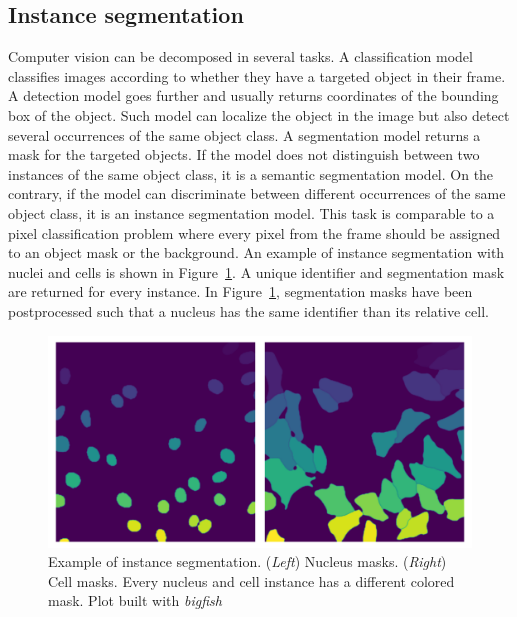 \subsection{Instance segmentation}
\label{subsec:segmentation_instance_introduction}

Computer vision can be decomposed in several tasks.
A classification model classifies images according to whether they have a targeted object in their frame.
A detection model goes further and usually returns coordinates of the bounding box of the object.
Such model can localize the object in the image but also detect several occurrences of the same object class.
A segmentation model returns a mask for the targeted objects.
If the model does not distinguish between two instances of the same object class, it is a semantic segmentation model.
On the contrary, if the model can discriminate between different occurrences of the same object class, it is an instance segmentation model.
This task is comparable to a pixel classification problem where every pixel from the frame should be assigned to an object mask or the background.
An example of instance segmentation with nuclei and cells is shown in Figure~\ref{fig:instance_segmentation_example}.
A unique identifier and segmentation mask are returned for every instance.
In Figure~\ref{fig:instance_segmentation_example}, segmentation masks have been postprocessed such that a nucleus has the same identifier than its relative cell.

\begin{figure}[]
    \centering
    \includegraphics[width=\textwidth]{figures/chapter3/instance_segmentation}
    \caption[Example of instance segmentation]{Example of instance segmentation.
	(\textit{Left}) Nucleus masks.
	(\textit{Right}) Cell masks.
	Every nucleus and cell instance has a different colored mask.
	Plot built with \emph{bigfish}}
    \label{fig:instance_segmentation_example}
\end{figure}

